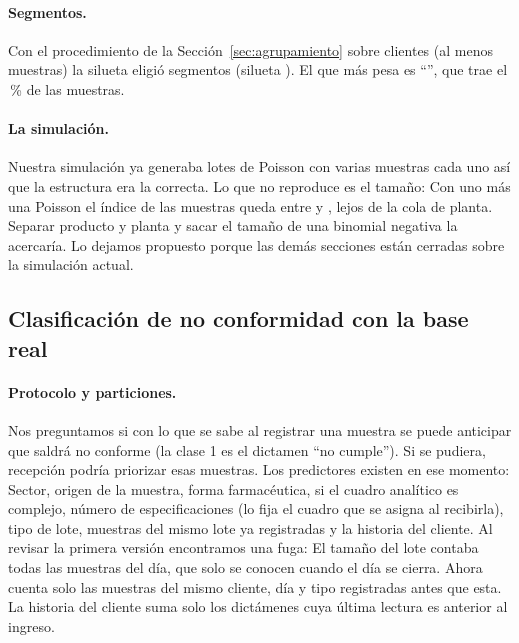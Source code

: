 \begin{table}[!htbp]
\centering
{}
\caption{Modelos del tamaño de lote por tipo: La binomial negativa tiene el
menor AIC en los dos.}
\label{tab:real-tamano}
\end{table}

\paragraph{Segmentos.} Con el procedimiento de la
Sección~\ref{sec:agrupamiento} sobre \RealSegClientes{} clientes (al menos
\RealSegMinimoMuestras{} muestras) la silueta eligió \RealSegK{} segmentos
(silueta \RealSegSilueta{}). El que más pesa es ``\RealSegMayor'', que trae
el \RealSegMayorMuestrasPct{}\,\% de las muestras.

\paragraph{La simulación.} Nuestra simulación ya generaba lotes de Poisson
con varias muestras cada uno así que la estructura era la correcta. Lo que no
reproduce es el tamaño: Con uno más una Poisson el índice de las muestras
queda entre \RealSimIndiceBajo{} y \RealSimIndiceAlto{}, lejos de la cola de
planta. Separar producto y planta y sacar el tamaño de una binomial negativa
la acercaría. Lo dejamos propuesto porque las demás secciones están
cerradas sobre la simulación actual.
\subsection{Clasificación de no conformidad con la base real}
\label{sec:real-clasificacion}

\paragraph{Protocolo y particiones.} Nos preguntamos si con lo que se sabe
al registrar una muestra se puede anticipar que saldrá no conforme (la clase
1 es el dictamen ``no cumple''). Si se pudiera, recepción podría priorizar
esas muestras. Los \RealRiesgoVariables{} predictores existen en ese momento:
Sector, origen de la muestra, forma farmacéutica, si el cuadro analítico es
complejo, número de especificaciones (lo fija el cuadro que se asigna al
recibirla), tipo de lote, muestras del mismo lote ya registradas y la
historia del cliente. Al revisar la primera versión encontramos una fuga: El
tamaño del lote contaba todas las muestras del día, que solo se conocen
cuando el día se cierra. Ahora cuenta solo las muestras del mismo cliente,
día y tipo registradas antes que esta. La historia del cliente suma solo los
dictámenes cuya última lectura es anterior al ingreso.

